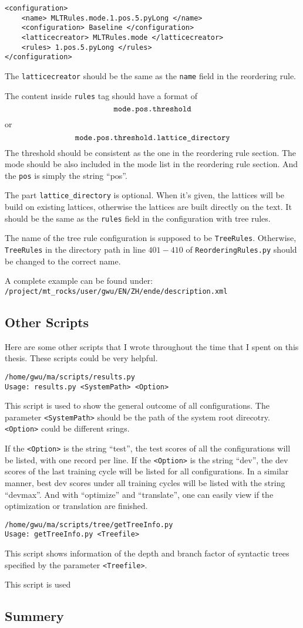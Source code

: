 \begin{Verbatim}[frame=single]
<configuration>
    <name> MLTRules.mode.1.pos.5.pyLong </name>
    <configuration> Baseline </configuration>
    <latticecreator> MLTRules.mode </latticecreator>
    <rules> 1.pos.5.pyLong </rules>
</configuration>
\end{Verbatim}
The \verb|latticecreator| should be the same as the \verb|name| field in the reordering rule. 

The content inside \verb|rules| tag should have a format of $$\verb|mode.pos.threshold|$$ or $$\verb|mode.pos.threshold.lattice_directory|$$ The threshold should be consistent as the one in the reordering rule section. The mode should be also included in the mode list in the reordering rule section. And the \verb|pos| is simply the string ``pos''.

The part \verb|lattice_directory| is optional. When it's given, the lattices will be build on existing lattices, otherwise the lattices are built directly on the text. It should be the same as the \verb|rules| field in the configuration with tree rules. 

The name of the tree rule configuration is supposed to be \verb|TreeRules|. Otherwise, \verb|TreeRules| in the directory path in line $401-410$ of \verb|ReorderingRules.py| should be changed to the correct name.

A complete example can be found under:\\
\verb|/project/mt_rocks/user/gwu/EN/ZH/ende/description.xml|

\subsection{Other Scripts}

Here are some other scripts that I wrote throughout the time that I spent on this thesis. These scripts could be very helpful.

\verb|/home/gwu/ma/scripts/results.py|\\
\verb|Usage: results.py <SystemPath> <Option>|

This script is used to show the general outcome of all configurations. The parameter \verb|<SystemPath>| should be the path of the system root direcotry. \verb|<Option>| could be different srings.

If the \verb|<Option>| is the string ``test'', the test scores of all the configurations will be listed, with one record per line. If the \verb|<Option>| is the string ``dev'', the dev scores of the last training cycle will be listed for all configurations. In a similar manner, best dev scores under all training cycles will be listed with the string ``devmax''. And with ``optimize'' and ``translate'', one can easily view if the optimization or translation are finished.

\verb|/home/gwu/ma/scripts/tree/getTreeInfo.py|\\
\verb|Usage: getTreeInfo.py <Treefile>|

This script shows information of the depth and branch factor of syntactic trees specified by the parameter \verb|<Treefile>|. 



This script is used

	
\subsection{Summery}

